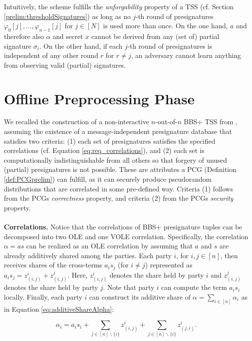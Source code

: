 Intuitively, the scheme fulfills the \textit{unforgability} property of a TSS (cf. Section \ref{prelim:thresholdSignatures}) as long as no $j$-th round of presignatures $\varphi_{0}[j], \ldots, \varphi_{n-1}[j]$ for $j \in [N]$  is used more than once. On the one hand, $a$ and therefore also $\alpha$ and secret $x$ cannot be derived from any (set of) partial signature $\sigma_i$. On the other hand, if each $j$-th round of presignatures is independent of any other round $r$ for $r \neq j$, an adversary cannot learn anything from observing valid (partial) signatures.

\section{Offline Preprocessing Phase}
We recalled the construction of a non-interactive $n$-out-of-$n$ BBS+ TSS from \cite{faust2023non}, assuming the existence of a message-independent presignature database that satisfies two criteria: (1) each set of presignatures satisfies the specified correlations (cf. Equation \ref{eq:req_correlations}), and (2) each set is computationally indistinguishable from all others so that forgery of unused (partial) presignatures is not possible. These are attributes a PCG (Definition \ref{def:PCGprelim}) can fulfill, as it can securely produce pseudorandom distributions that are correlated in some pre-defined way. Criteria (1) follows from the PCGs \textit{correctness} property, and criteria (2) from the PCGs \textit{security} property.
\\\\
\textbf{Correlations.} Notice that the correlations of BBS+ presignature tuples can be decomposed into two OLE and one VOLE correlation. Specifically, the correlation $\alpha = as$ can be realized as an OLE correlation by assuming that $a$ and $s$ are already additively shared among the parties. Each party $i$, for $i, j \in [n]$, then receives shares of the cross-terms $a_is_j$ (for $i \neq j$) represented as  $a_is_j = z_{(i,j)}^i+z_{(i,j)}^j$. Here, $z_{(i,j)}^i$ denotes the share held by party $i$ and $z_{(i,j)}^j$ denotes the share held by party $j$. Note that party $i$ can compute the term $a_is_i$ locally. Finally, each party $i$ can construct its additive share of $\alpha = \sum_{i\in [n]}\alpha_i$ as in Equation \ref{eq:additiveShareAlpha}:

\begin{equation}
  \alpha_i=a_is_i + \sum_{j \in [n]\backslash \{i\}}{z_{(i,j)}^i} + \sum_{j \in [n]\backslash \{i\}}z_{(j,i)}^i.
  \label{eq:additiveShareAlpha}
\end{equation}

